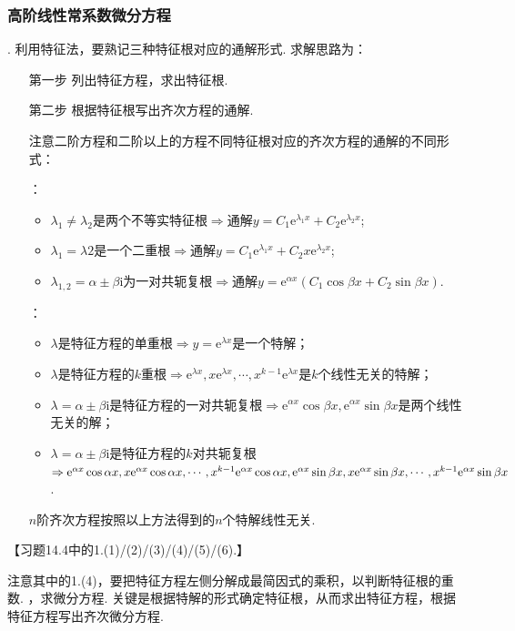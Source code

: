 \documentclass[12pt,UTF8]{ctexart}
\newcommand{\me}[0]{\mathrm e}
\newcommand{\m}[0]{\mathrm }
\begin{document}
\subsubsection{高阶线性常系数微分方程}
\begin{enumerate}
. 利用特征法，要熟记三种特征根对应的通解形式. 求解思路为：
\begin{enumerate}
\item[第一步]列出特征方程，求出特征根.
\item[第二步]根据特征根写出齐次方程的通解.

注意二阶方程和二阶以上的方程不同特征根对应的齐次方程的通解的不同形式：
\begin{enumerate}
：
\begin{itemize}
\item$\lambda_1\neq\lambda_2$是两个不等实特征根$\Rightarrow$通解$y=C_1\me^{\lambda_1x}+C_2\me^{\lambda_2x}$;
\item$\lambda_1=\lambda2$是一个二重根$\Rightarrow$通解$y=C_1\me^{\lambda_1x}+C_2x\me^{\lambda_2x}$;
\item$\lambda_{1,2}=\alpha\pm\beta\m i$为一对共轭复根$\Rightarrow$通解$y=\me^{\alpha x}(C_1\cos\beta x+C_2\sin\beta x)$.
\end{itemize}
：
\begin{itemize}
\item$\lambda$是特征方程的单重根$\Rightarrow y=\me^{\lambda x}$是一个特解；
\item$\lambda$是特征方程的$k$重根$\Rightarrow \me^{\lambda x},x\me^{\lambda x},\cdots,x^{k-1}\me^{\lambda x}$是$k$个线性无关的特解；
\item$\lambda=\alpha\pm\beta\m i$是特征方程的一对共轭复根$\Rightarrow\me^{\alpha x}\cos\beta x,\me^{\alpha x}\sin\beta x$是两个线性无关的解；
\item$\lambda=\alpha\pm\beta\m i$是特征方程的$k$对共轭复根\\
$\Rightarrow \me^{\alpha x}\cos\alpha x,x\me^{\alpha x}\cos\alpha x,\cdots,x^{k-1}\me^{\alpha x}\cos\alpha x,\\\me^{\alpha x}\sin\beta x,x\me^{\alpha x}\sin\beta x,\cdots,x^{k-1}\me^{\alpha x}\sin\beta x$.
\end{itemize}
$n$阶齐次方程按照以上方法得到的$n$个特解线性无关.
\end{enumerate}
\end{enumerate}

【习题14.4中的1.(1)/(2)/(3)/(4)/(5)/(6).】

注意其中的1.(4)，要把特征方程左侧分解成最简因式的乘积，以判断特征根的重数.
，求微分方程. 关键是根据特解的形式确定特征根，从而求出特征方程，根据特征方程写出齐次微分方程.


\end{enumerate}
\end{document}
